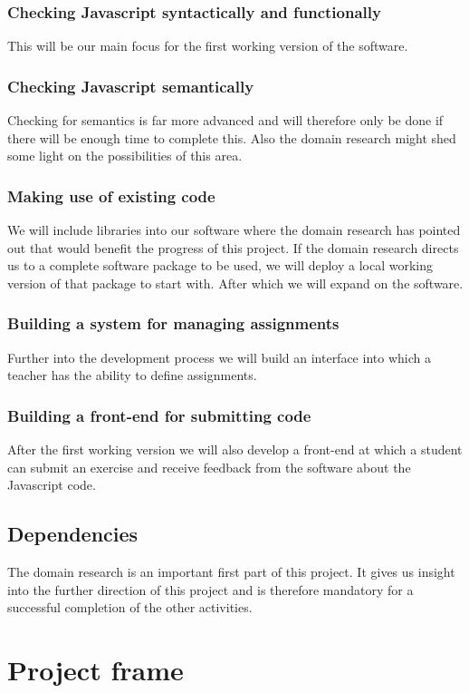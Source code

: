 \documentclass{article}
\begin{document}
\begin{itemize}
\subsubsection{Checking Javascript syntactically and functionally}
This will be our main focus for the first working version of the software.
\subsubsection{Checking Javascript semantically}
Checking for semantics is far more advanced and will therefore only be done if there will be enough time to complete this. Also the domain research might shed some light on the possibilities of this area.
\subsubsection{Making use of existing code}
We will include libraries into our software where the domain research has pointed out that would benefit the progress of this project. If the domain research directs us to a complete software package to be used, we will deploy a local working version of that package to start with. After which we will expand on the software.
\subsubsection{Building a system for managing assignments}
Further into the development process we will build an interface into which a teacher has the ability to define assignments.
\subsubsection{Building a front-end for submitting code}
After the first working version we will also develop a front-end at which a student can submit an exercise and receive feedback from the software about the Javascript code.
\subsection{Dependencies}
The domain research is an important first part of this project. It gives us insight into the further direction of this project and is therefore mandatory for a successful completion of the other activities.

\section{Project frame}


\end{itemize}
\end{document}
